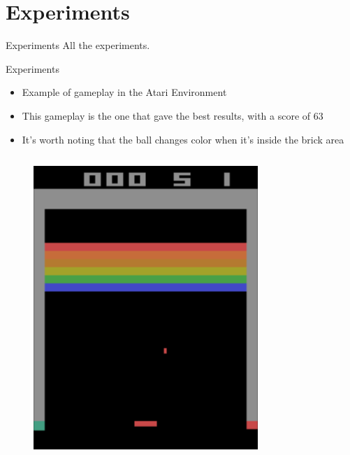 \section{Experiments}

\begin{frame}{Experiments}
    All the experiments.
\end{frame}

\begin{frame}{Experiments}
    \begin{itemize}
        \item Example of gameplay in the Atari Environment
        \item This gameplay is the one that gave the best results, with a score of 63
        \item It's worth noting that the ball changes color when it's inside the brick area
    \end{itemize}
    \begin{columns}[c,onlytextwidth]
        \begin{figure}
            \includegraphics[width=\textwidth]{images/atari-sequence-0.png}

\end{figure}
\end{columns}
\end{frame}

